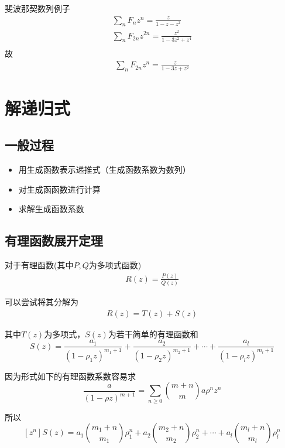 斐波那契数列例子
\begin{align*}
    \sum_{n} F_{n} z^{n}=\frac{z}{1-z-z^{2}}\\
    \sum_{n} F_{2n} z^{2n}= \frac{z^{2}}{1-3 z^{2}+z^{4}} \\
\end{align*}
故
\begin{align}
    \sum_{n} F_{2n} z^{n}= \frac{z}{1-3 z+z^{2}}
\end{align}

\section{解递归式}

\subsection{一般过程}
\begin{itemize}
    \item 用生成函数表示递推式（生成函数系数为数列）
    \item 对生成函函数进行计算
    \item 求解生成函数系数
\end{itemize}

\subsection{有理函数展开定理}
对于有理函数(其中$P, Q$为多项式函数)
\begin{align*}
    R(z) = \frac{P(z)}{Q(z)}
\end{align*}

可以尝试将其分解为
\begin{align*}
    R(z) = T(z) + S(z)
\end{align*}

其中$T(z)$为多项式，$S(z)$为若干简单的有理函数和
\setcounter{equation}{25}
\begin{equation}
    S(z)=\frac{a_{1}}{\left(1-\rho_{1} z\right)^{m_{1}+1}}+\frac{a_{2}}{\left(1-\rho_{2} z\right)^{m_{2}+1}}+\cdots+\frac{a_{l}}{\left(1-\rho_{l} z\right)^{m_{l}+1}}
\end{equation}

因为形式如下的有理函数系数容易求
\setcounter{equation}{24}
\begin{equation}
    \frac{a}{(1-\rho z)^{m+1}}=\sum_{n \ge 0}{m+n  \choose m} a \rho^{n} z^{n}
\end{equation}

所以
\setcounter{equation}{26}
\begin{equation}
    \left[z^{n}\right] S(z)=a_{1}{m_{1}+n  \choose m_{1}} \rho_{1}^{n}+a_{2}{m_{2}+n  \choose m_{2}} \rho_{2}^{n}+\cdots+a_{l}{m_{l}+n  \choose m_{l}} \rho_{l}^{n}
\end{equation}

